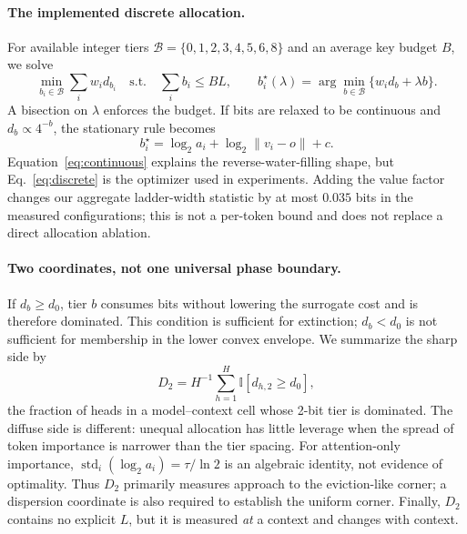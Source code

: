 \documentclass{article}
\theoremstyle{definition}
\begin{document}
\paragraph{The implemented discrete allocation.}
For available integer tiers $\mathcal B=\{0,1,2,3,4,5,6,8\}$ and an average key budget $B$, we solve
\begin{equation}
 \min_{b_i\in\mathcal B}\sum_i w_i d_{b_i}
 \quad\text{s.t.}\quad \sum_i b_i\le BL,
 \qquad
 b_i^\star(\lambda)=\arg\min_{b\in\mathcal B}\{w_i d_b+\lambda b\}.
 \label{eq:discrete}
\end{equation}
A bisection on $\lambda$ enforces the budget.  If bits are relaxed to be continuous and $d_b\propto4^{-b}$, the stationary rule becomes
\begin{equation}
 b_i^\star=\log_2a_i+\log_2\|v_i-o\|+c .
 \label{eq:continuous}
\end{equation}
Equation~\ref{eq:continuous} explains the reverse-water-filling shape, but Eq.~\ref{eq:discrete} is the optimizer used in experiments.  Adding the value factor changes our aggregate ladder-width statistic by at most $0.035$ bits in the measured configurations; this is not a per-token bound and does not replace a direct allocation ablation.

\paragraph{Two coordinates, not one universal phase boundary.}
If $d_b\ge d_0$, tier $b$ consumes bits without lowering the surrogate cost and is therefore dominated.  This condition is sufficient for extinction; $d_b<d_0$ is not sufficient for membership in the lower convex envelope.  We summarize the sharp side by
\begin{equation}
 D_2=H^{-1}\sum_{h=1}^{H}\mathbb I[d_{h,2}\ge d_0],
 \label{eq:d2}
\end{equation}
the fraction of heads in a model--context cell whose 2-bit tier is dominated.  The diffuse side is different: unequal allocation has little leverage when the spread of token importance is narrower than the tier spacing.  For attention-only importance,
$\operatorname{std}_i(\log_2a_i)=\tau/\ln2$ is an algebraic identity, not evidence of optimality.  Thus $D_2$ primarily measures approach to the eviction-like corner; a dispersion coordinate is also required to establish the uniform corner.  Finally, $D_2$ contains no explicit $L$, but it is measured \emph{at} a context and changes with context.

\end{document}
